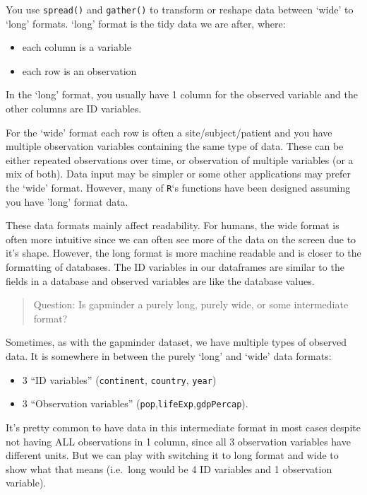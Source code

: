 \documentclass[]{book}
\providecommand{\tightlist}{%
  \setlength{\itemsep}{0pt}\setlength{\parskip}{0pt}}
\theoremstyle{definition}
\theoremstyle{definition}
\theoremstyle{definition}
\theoremstyle{remark}
\begin{document}
You use \texttt{spread()} and \texttt{gather()} to transform or reshape
data between `wide' to `long' formats. `long' format is the tidy data we
are after, where:

\begin{itemize}
\tightlist
\item
  each column is a variable
\item
  each row is an observation
\end{itemize}

In the `long' format, you usually have 1 column for the observed
variable and the other columns are ID variables.

For the `wide' format each row is often a site/subject/patient and you
have multiple observation variables containing the same type of data.
These can be either repeated observations over time, or observation of
multiple variables (or a mix of both). Data input may be simpler or some
other applications may prefer the `wide' format. However, many of
\texttt{R}`s functions have been designed assuming you have 'long'
format data.

These data formats mainly affect readability. For humans, the wide
format is often more intuitive since we can often see more of the data
on the screen due to it's shape. However, the long format is more
machine readable and is closer to the formatting of databases. The ID
variables in our dataframes are similar to the fields in a database and
observed variables are like the database values.

\begin{quote}
Question: Is gapminder a purely long, purely wide, or some intermediate
format?
\end{quote}

Sometimes, as with the gapminder dataset, we have multiple types of
observed data. It is somewhere in between the purely `long' and `wide'
data formats:

\begin{itemize}
\tightlist
\item
  3 ``ID variables'' (\texttt{continent}, \texttt{country},
  \texttt{year})
\item
  3 ``Observation variables''
  (\texttt{pop},\texttt{lifeExp},\texttt{gdpPercap}).
\end{itemize}

It's pretty common to have data in this intermediate format in most
cases despite not having ALL observations in 1 column, since all 3
observation variables have different units. But we can play with
switching it to long format and wide to show what that means (i.e.~long
would be 4 ID variables and 1 observation variable).
\end{document}
